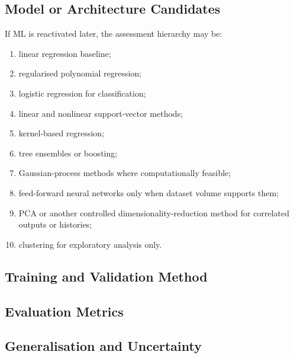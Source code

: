 \subsection{Model or Architecture Candidates}
\label{sec:res-ml-alg-model-architecture-candidates}

If ML is reactivated later, the assessment hierarchy may be:
\begin{enumerate}
  \item linear regression baseline;
  \item regularised polynomial regression;
  \item logistic regression for classification;
  \item linear and nonlinear support-vector methods;
  \item kernel-based regression;
  \item tree ensembles or boosting;
  \item Gaussian-process methods where computationally feasible;
  \item feed-forward neural networks only when dataset volume supports them;
  \item PCA or another controlled dimensionality-reduction method for
    correlated outputs or histories;
  \item clustering for exploratory analysis only.
\end{enumerate}

\subsection{Training and Validation Method}
\label{sec:res-ml-alg-training-validation-method}


\subsection{Evaluation Metrics}
\label{sec:res-ml-alg-evaluation-metrics}


\subsection{Generalisation and Uncertainty}
\label{sec:res-ml-alg-generalisation-uncertainty}


